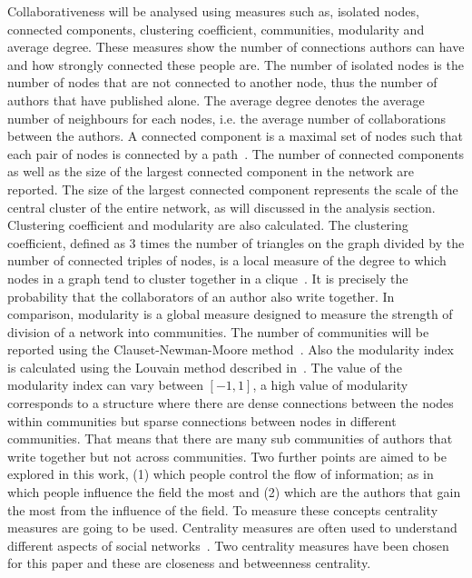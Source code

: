 \documentclass{article}
\theoremstyle{definition}
\begin{document}
Collaborativeness will be analysed using measures such as, isolated nodes,
connected components, clustering coefficient, communities, modularity and average degree.
These measures show the number of connections authors can have
and how strongly connected these people are. The number of isolated nodes is the
number of nodes that are not connected to another node, thus the
number of authors that have published alone. The average degree denotes the average
number of neighbours for each nodes, i.e. the average number of collaborations
between the authors.
A connected component is a maximal set of nodes such that each pair of nodes is
connected by a path~\cite{Easley2010}. The number of connected components as well as the size of the
largest connected component in the network are reported.
The size of the largest connected component represents the scale of the central cluster
of the entire network, as will discussed in the analysis section.
Clustering coefficient and modularity are also calculated. The clustering
coefficient, defined as 3 times the number of triangles on the graph divided
by the number of connected triples of nodes, is a local measure of the degree to
which nodes in a graph tend to cluster together
in a clique~\cite{Easley2010}. It is precisely the probability that the collaborators
of an author also write together.
In comparison, modularity is a global measure designed to measure the strength of
division of a network into communities. The number of communities will be reported
using the Clauset-Newman-Moore method~\cite{clauset2004}. Also the modularity index
is calculated using the Louvain method described in~\cite{Blondel2008}. The value
of the modularity index can vary between \([-1, 1]\), a high value of modularity
corresponds to a structure where there are dense connections between the nodes within
communities but sparse connections between nodes in different communities.
That means that there are many sub communities of authors that write together
but not across communities.
Two further points are aimed to be explored in this work, (1) which people control the flow
of information;
as in which people influence the field the most and (2) which are the authors that
gain the most from the influence of the field. To measure these concepts
centrality measures are going to be used.
Centrality measures are often used to understand different
aspects of social networks~\cite{Landherr2010}. Two centrality measures have been
chosen for this paper and these are closeness and betweenness centrality.
\end{document}
